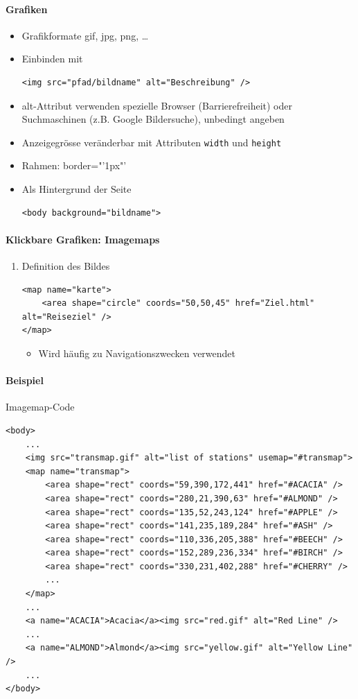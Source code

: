 \paragraph{Grafiken}
\begin{itemize}[noitemsep,topsep=0pt,leftmargin=*]
    \item Grafikformate gif, jpg, png, \dots
    \item Einbinden mit
    \begin{lstlisting}
<img src="pfad/bildname" alt="Beschreibung" />
    \end{lstlisting}
    \item alt-Attribut verwenden spezielle Browser (Barrierefreiheit) oder Suchmaschinen (z.B. Google Bildersuche), unbedingt angeben
    \item Anzeigegrösse veränderbar mit Attributen \texttt{width} und \texttt{height}
    \item Rahmen: border="'1px"' %
    \item Als Hintergrund der Seite
    \begin{lstlisting}
<body background="bildname">
    \end{lstlisting}
\end{itemize}

\paragraph{Klickbare Grafiken: Imagemaps}
\begin{enumerate}[noitemsep,topsep=0pt,leftmargin=*]
    \item Definition des Bildes
    \begin{lstlisting}
<map name="karte">
    <area shape="circle" coords="50,50,45" href="Ziel.html" alt="Reiseziel" />
</map>
    \end{lstlisting}
    \begin{itemize}[noitemsep,topsep=0pt,leftmargin=*]
        \item Wird häufig zu Navigationszwecken verwendet
    \end{itemize}
\end{enumerate}

\paragraph{Beispiel}Imagemap-Code
\begin{lstlisting}
<body>
    ...
    <img src="transmap.gif" alt="list of stations" usemap="#transmap">
    <map name="transmap">
        <area shape="rect" coords="59,390,172,441" href="#ACACIA" />
        <area shape="rect" coords="280,21,390,63" href="#ALMOND" />
        <area shape="rect" coords="135,52,243,124" href="#APPLE" />
        <area shape="rect" coords="141,235,189,284" href="#ASH" />
        <area shape="rect" coords="110,336,205,388" href="#BEECH" />
        <area shape="rect" coords="152,289,236,334" href="#BIRCH" />
        <area shape="rect" coords="330,231,402,288" href="#CHERRY" />
        ...
    </map>
    ...
    <a name="ACACIA">Acacia</a><img src="red.gif" alt="Red Line" />
    ...
    <a name="ALMOND">Almond</a><img src="yellow.gif" alt="Yellow Line" />
    ...
</body>
\end{lstlisting}

